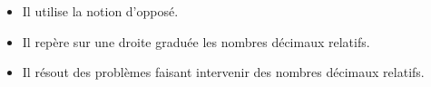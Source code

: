 \begin{prerequis}[Objectifs de 5\up{e}]  
    \begin{itemize}  
        \item Il utilise la notion d'opposé.
        \item Il repère sur une droite graduée les nombres décimaux relatifs.
        \item Il résout des problèmes faisant intervenir des nombres décimaux relatifs.
    \end{itemize}
\end{prerequis}
